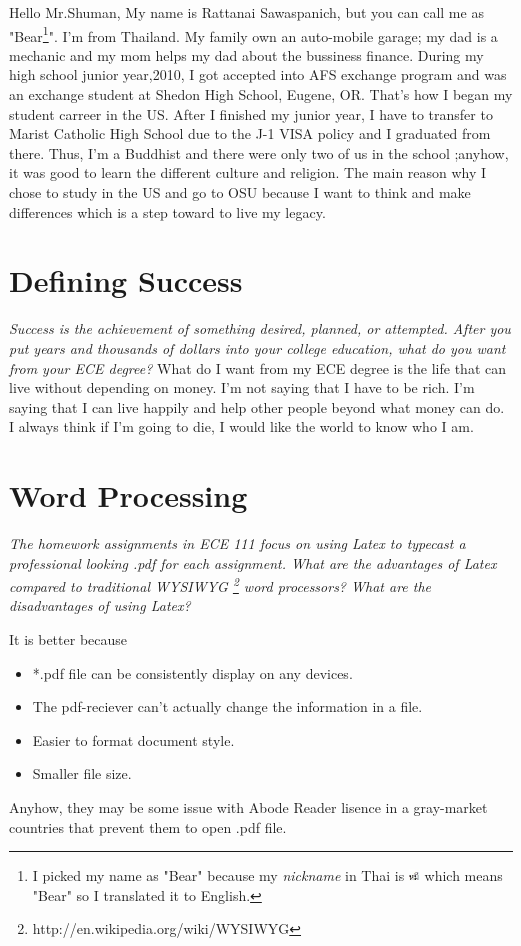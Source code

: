 \documentclass{article}
\begin{document}
 Hello Mr.Shuman,  My name is Rattanai Sawaspanich, but you can call me as "Bear\footnote{I picked my name as "Bear" because my \emph{nickname} in Thai is \includegraphics[width=0.115in]{./Bear_T.jpg} which means "Bear" so I translated it to English.}".  I'm from Thailand. My family own an auto-mobile garage; my dad is a mechanic and my mom helps my dad about the bussiness finance.   During my high school junior year,2010, I got accepted into AFS exchange program and was an exchange student at Shedon High School, Eugene, OR. That's how I began my student carreer in the US. After I finished my junior year, I have to transfer to Marist Catholic High School due to the J-1 VISA policy and I graduated from there. Thus, I'm a Buddhist and there were only two of us in the school ;anyhow, it was good to learn the different culture and religion.  The main reason why I chose to study in the US and go to OSU  because I want to think and make differences which is a step toward to live my legacy.  
\section{Defining Success}
\emph{Success is the achievement of something desired, planned, or attempted. After you put years and thousands of dollars into your 
college education, what do you want from your ECE degree?}
\newline\newline
What do I want from my ECE degree is the life that can live without depending on money. I'm not saying that I have to be rich. I'm saying that I can live happily and help other people beyond what money can do. I always think if I'm going to die, I would like the world to know who I am.

\section{Word Processing}
\emph{The homework assignments in ECE 111 focus on using Latex to typecast a professional looking .pdf for each assignment.  What are the advantages of Latex compared to traditional WYSIWYG \footnote{http://en.wikipedia.org/wiki/WYSIWYG} word processors?  What are the disadvantages of using Latex?}\newline\newline

It is better because \newline \begin{itemize}

\item *.pdf file can be consistently display on any devices.
\item The pdf-reciever can't actually change the information in a file.
\item Easier to format document style.
\item Smaller file size.
\end{itemize}
Anyhow, they may be some issue with Abode Reader lisence in a gray-market countries that prevent them to open .pdf file.
\end{document}
